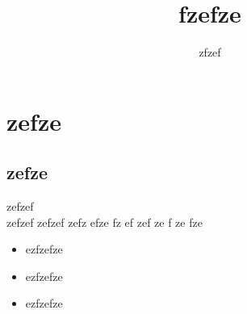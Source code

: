 \documentclass[12pt,a4paper,twoside]{article}
\begin{document}
\title{fzefze}
\author{zfzef}
\maketitle
\section{zefze}
\subsection{zefze}
zefzef\\
zefzef zefzef zefz efze fz ef zef ze f ze fze\\
\begin{itemize}
\item ezfzefze\item ezfzefze\item ezfzefze\end{itemize}
\end{document}
